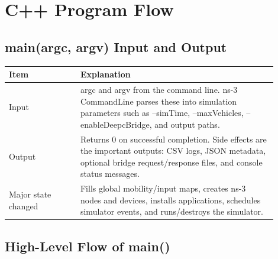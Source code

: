 \documentclass[11pt]{article}
\DeclareRobustCommand{\code}[1]{\texttt{\detokenize{#1}}}
\def\code#1{#1}%
\begin{document}
\section{C++ Program Flow}

\subsection{\code{main(argc, argv)} Input and Output}

\begin{center}
\begin{tabular}{L{0.24\linewidth}L{0.66\linewidth}}
\toprule
Item & Explanation \\
\midrule
Input &
\code{argc} and \code{argv} from the command line.  ns-3 \code{CommandLine}
parses these into simulation parameters such as \code{--simTime},
\code{--maxVehicles}, \code{--enableDeepcBridge}, and output paths. \\
Output &
Returns \code{0} on successful completion.  Side effects are the important
outputs: CSV logs, JSON metadata, optional bridge request/response files, and
console status messages. \\
Major state changed &
Fills global mobility/input maps, creates ns-3 nodes and devices, installs
applications, schedules simulator events, and runs/destroys the simulator. \\
\bottomrule
\end{tabular}
\end{center}

\subsection{High-Level Flow of \code{main()}}
\end{document}
